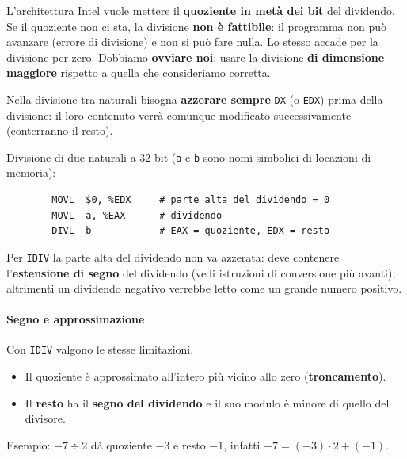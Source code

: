 \documentclass[11pt,a4paper]{article}
\begin{document}
L'architettura Intel vuole mettere il \textbf{quoziente in metà dei bit} del dividendo. Se il quoziente non ci sta, la divisione \textbf{non è fattibile}: il programma non può avanzare (errore di divisione) e non si può fare nulla. Lo stesso accade per la divisione per zero. Dobbiamo \textbf{ovviare noi}: usare la divisione \textbf{di dimensione maggiore} rispetto a quella che consideriamo corretta.

\begin{nota}
Nella divisione tra naturali bisogna \textbf{azzerare sempre} \texttt{DX} (o \texttt{EDX}) prima della divisione: il loro contenuto verrà comunque modificato successivamente (conterranno il resto).
\end{nota}

\begin{integrazione}
Divisione di due naturali a 32 bit (\texttt{a} e \texttt{b} sono nomi simbolici di locazioni di memoria):
\begin{lstlisting}
        MOVL  $0, %EDX     # parte alta del dividendo = 0
        MOVL  a, %EAX      # dividendo
        DIVL  b            # EAX = quoziente, EDX = resto
\end{lstlisting}
Per \texttt{IDIV} la parte alta del dividendo non va azzerata: deve contenere l'\textbf{estensione di segno} del dividendo (vedi istruzioni di conversione più avanti), altrimenti un dividendo negativo verrebbe letto come un grande numero positivo.
\end{integrazione}

\paragraph*{Segno e approssimazione}

Con \texttt{IDIV} valgono le stesse limitazioni.
\begin{itemize}[leftmargin=*]
  \item Il quoziente è approssimato all'intero più vicino allo zero (\textbf{troncamento}).
  \item Il \textbf{resto} ha il \textbf{segno del dividendo} e il suo modulo è minore di quello del divisore.
\end{itemize}

\begin{integrazione}
Esempio: $-7 \div 2$ dà quoziente $-3$ e resto $-1$, infatti $-7 = (-3)\cdot 2 + (-1)$.
\end{integrazione}
\end{document}
